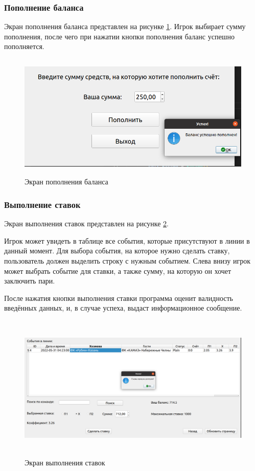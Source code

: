 \subsubsection{Пополнение баланса}
Экран пополнения баланса представлен на рисунке \ref{fig::balance}. 
Игрок выбирает сумму пополнения, после чего при нажатии кнопки пополнения баланс успешно пополняется.

\FloatBarrier
\begin{figure}[h]	
	\begin{center}
		\includegraphics[height = 6cm, width=\linewidth]{inc/balance.png}
	\end{center}
	\caption{Экран пополнения баланса}
	\label{fig::balance}
\end{figure}
\FloatBarrier

\subsubsection{Выполнение ставок}
Экран выполнения ставок представлен на рисунке \ref{fig::bet}.

Игрок может увидеть в таблице все события, которые присутствуют в линии в данный момент.
Для выбора события, на которое нужно сделать ставку, пользователь должен выделить строку с нужным событием.
Слева внизу игрок может выбрать событие для ставки, а также сумму, на которую он хочет заключить пари.

После нажатия кнопки выполнения ставки программа оценит валидность введённых данных, и, в случае успеха, выдаст информационное сообщение.

\FloatBarrier
\begin{figure}[h]	
	\begin{center}
		\includegraphics[height = 7cm, width=\linewidth]{inc/bet.png}
	\end{center}
	\caption{Экран выполнения ставок}
	\label{fig::bet}
\end{figure}
\FloatBarrier

